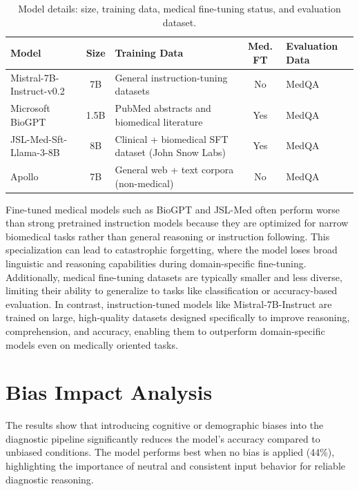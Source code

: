 \begin{table}[H]
    \centering
    \begin{tabular}{l c p{4.2cm} c p{3.5cm}}
    \toprule
    \textbf{Model} & \textbf{Size} & \textbf{Training Data} & \textbf{Med. FT} & \textbf{Evaluation Data} \\
    \midrule
    Mistral-7B-Instruct-v0.2 & 7B & General instruction-tuning datasets & No & MedQA \\
    Microsoft BioGPT & 1.5B & PubMed abstracts and biomedical literature & Yes & MedQA \\
    JSL-Med-Sft-Llama-3-8B & 8B & Clinical + biomedical SFT dataset (John Snow Labs) & Yes & MedQA \\
    Apollo & 7B & General web + text corpora (non-medical) & No & MedQA \\
    \bottomrule
    \end{tabular}
    \caption{Model details: size, training data, medical fine-tuning status, and evaluation dataset.}
\end{table}

Fine-tuned medical models such as BioGPT and JSL-Med often perform worse than strong pretrained instruction models because they are optimized for narrow biomedical tasks rather than general reasoning or instruction following. This specialization can lead to catastrophic forgetting, where the model loses broad linguistic and reasoning capabilities during domain-specific fine-tuning. \\

Additionally, medical fine-tuning datasets are typically smaller and less diverse, limiting their ability to generalize to tasks like classification or accuracy-based evaluation. In contrast, instruction-tuned models like Mistral-7B-Instruct are trained on large, high-quality datasets designed specifically to improve reasoning, comprehension, and accuracy, enabling them to outperform domain-specific models even on medically oriented tasks.


\section{Bias Impact Analysis}

The results show that introducing cognitive or demographic biases into the diagnostic pipeline significantly reduces the model’s accuracy compared to unbiased conditions. The model performs best when no bias is applied (44\%), highlighting the importance of neutral and consistent input behavior for reliable diagnostic reasoning. \\

